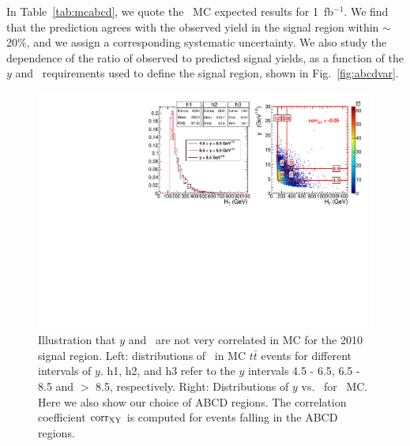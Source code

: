 In Table~\ref{tab:mcabcd}, we quote the \ttbar\ MC expected results for 1~fb$^{-1}$. We 
find that the prediction agrees with the observed yield in the signal region within
$\sim$20\%, and we assign a corresponding systematic uncertainty. We also study the dependence of the ratio
of observed to predicted signal yields, as a function of the $y$ and \Ht\
requirements used to define the signal region, shown in Fig.~\ref{fig:abcdvar}.

\clearpage

\begin{figure}[h!]
\begin{center}
\includegraphics[width=1\linewidth]{plots/abcd_tt.pdf}
\caption{\label{fig:uncor}\protect
Illustration that $y$ and \Ht\ are not very correlated in MC for the 2010 signal region.
Left: distributions of \Ht\ in MC $t\bar{t}$ events for different intervals of $y$.
h1, h2, and h3 refer to the $y$ intervals 4.5 - 6.5, 6.5 - 8.5 and $>$ 8.5, respectively. Right:
Distributions of $y$ vs.
\Ht\ for \ttbar\ MC.  Here we also show our choice of ABCD regions. The correlation coefficient
${\rm corr_{XY}}$ is computed for events falling in the ABCD regions.
}
\end{center}
\end{figure}



